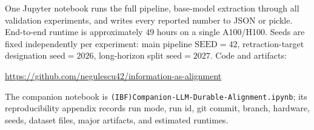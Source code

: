 \documentclass[11pt,twocolumn]{article}
\theoremstyle{plain}
\begin{document}
One Jupyter notebook runs the full pipeline, base-model extraction through all validation experiments, and writes every reported number to JSON or pickle. End-to-end runtime is approximately $49$ hours on a single A100/H100. Seeds are fixed independently per experiment: main pipeline $\mathrm{SEED}=42$, retraction-target designation $\mathrm{seed}=2026$, long-horizon split $\mathrm{seed}=2027$. Code and artifacts:
\begin{center}
\url{https://github.com/negulescu42/information-as-alignment}
\end{center}
The companion notebook is \texttt{(IBF)Companion-LLM-Durable-Alignment.ipynb}; its reproducibility appendix records run mode, run id, git commit, branch, hardware, seeds, dataset files, major artifacts, and estimated runtimes.

%
%
%
%
%
%
%
\end{document}
